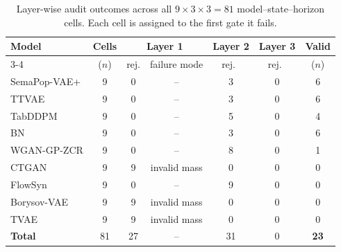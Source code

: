 \begin{table}[h] %
\centering
\caption{Layer-wise audit outcomes across all \(9\times3\times3=81\) model--state--horizon cells. Each cell is assigned to the first gate it fails.}
\label{tab:layerwise_outcomes}
\setlength{\tabcolsep}{5pt}\renewcommand{\arraystretch}{1.15}
\begin{tabular}{lcccccc}
\toprule
Model & Cells & \multicolumn{2}{c}{Layer 1} & Layer 2 & Layer 3 & Valid \\
\cmidrule(lr){3-4}
 & ($n$) & rej. & failure mode & rej.\ & rej.\ & ($n$) \\
\midrule
SemaPop-VAE+ & 9 & 0 & -- & 3 & 0 & 6 \\
TTVAE & 9 & 0 & -- & 3 & 0 & 6 \\
TabDDPM & 9 & 0 & -- & 5 & 0 & 4 \\
BN & 9 & 0 & -- & 3 & 0 & 6 \\
WGAN-GP-ZCR & 9 & 0 & -- & 8 & 0 & 1 \\
CTGAN & 9 & 9 & invalid mass & 0 & 0 & 0 \\
FlowSyn & 9 & 0 & -- & 9 & 0 & 0 \\
Borysov-VAE & 9 & 9 & invalid mass & 0 & 0 & 0 \\
TVAE & 9 & 9 & invalid mass & 0 & 0 & 0 \\
\midrule
\textbf{Total} & 81 & 27 & -- & 31 & 0 & \textbf{23} \\
\bottomrule
\end{tabular}
\end{table}
